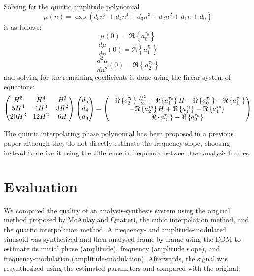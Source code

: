 Solving for the quintic amplitude polynomial
\begin{equation}
    \label{eq:quinticamppoly}
    \mu(n) = \exp \left(d_5 n^{5} + d_4 n^{4} + d_3 n^{3} + d_2 n^{2} + d_1 n + d_0 \right)
\end{equation}
is as follows:
\[
    \mu(0) = \Re \left\{ a^{\tau_0}_0 \right\}
\]
\[
    \frac{d \mu}{d n}(0) = \Re \left\{ a^{\tau_0}_1 \right\}
\]
\[
    \frac{d^{2} \mu}{d n^{2}}(0) = \Re \left\{ a^{\tau_0}_2 \right\}
\]
and solving for the remaining coefficients is done using the linear system of
equations:
\begin{equation}
    \begin{pmatrix}
        H^5 & H^4 & H^3 \\
        5 H^4 & 4 H^3 & 3 H^2 \\
        20 H^3 & 12 H^2 & 6 H
    \end{pmatrix}
    \begin{pmatrix}
        d_5 \\
        d_4 \\
        d_3
    \end{pmatrix}
    =
    \begin{pmatrix}
        -\Re \left\{  a^{\tau_0}_2  \right\} \frac{ H^{2} }{2} - \Re \left\{  a^{\tau_0}_1  \right\} H +
            \Re \left\{  a^{\tau_1}_0  \right\} - \Re \left\{  a^{\tau_1}_1  \right\} \\
        -\Re \left\{  a^{\tau_0}_2  \right\} H + \Re \left\{  a^{\tau_1}_1  \right\} - \Re \left\{  a^{\tau_0}_1  \right\} \\
        \Re \left\{  a^{\tau_1}_2  \right\} - \Re \left\{  a^{\tau_0}_2  \right\}
    \end{pmatrix}
\end{equation}

The quintic interpolating phase polynomial has been proposed in a previous paper
\cite{girin2003comparing} although they do not directly estimate the frequency
slope, choosing instead to derive it using the difference in frequency between
two analysis frames.

\section{Evaluation}

We compared the quality of an analysis-synthesis system using the
original method proposed by McAulay and Quatieri, the cubic interpolation
method, and the quartic interpolation method. A frequency- and
amplitude-modulated sinusoid was synthesized and then analysed frame-by-frame
using the DDM to estimate its initial phase (amplitude), frequency (amplitude
slope), and frequency-modulation (amplitude-modulation). Afterwards, the signal
was resynthesized using the estimated parameters and compared with the original.

